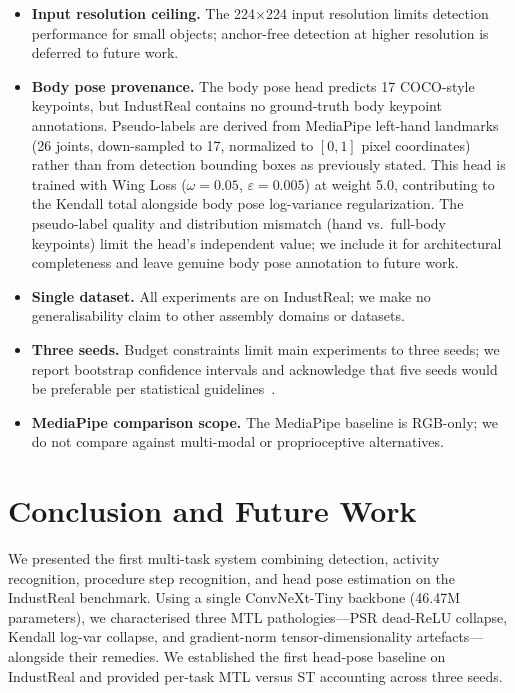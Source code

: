 \documentclass[conference]{IEEEtran}
\begin{document}
\begin{itemize}
    \item \textbf{Input resolution ceiling.} The 224$\times$224 input resolution limits detection performance for small objects; anchor-free detection at higher resolution is deferred to future work.
    \item \textbf{Body pose provenance.} The body pose head predicts 17 COCO-style keypoints, but IndustReal contains no ground-truth body keypoint annotations. Pseudo-labels are derived from MediaPipe left-hand landmarks (26 joints, down-sampled to 17, normalized to $[0,1]$ pixel coordinates) rather than from detection bounding boxes as previously stated. This head is trained with Wing Loss ($\omega=0.05$, $\varepsilon=0.005$) at weight 5.0, contributing to the Kendall total alongside body pose log-variance regularization. The pseudo-label quality and distribution mismatch (hand vs.\ full-body keypoints) limit the head's independent value; we include it for architectural completeness and leave genuine body pose annotation to future work.
    \item \textbf{Single dataset.} All experiments are on IndustReal; we make no generalisability claim to other assembly domains or datasets.
    \item \textbf{Three seeds.} Budget constraints limit main experiments to three seeds; we report bootstrap confidence intervals and acknowledge that five seeds would be preferable per statistical guidelines~\cite{decor2017}.
    \item \textbf{MediaPipe comparison scope.} The MediaPipe baseline is RGB-only; we do not compare against multi-modal or proprioceptive alternatives.
\end{itemize}

\section{Conclusion and Future Work}
\label{sec:conclusion}

We presented the first multi-task system combining detection, activity recognition, procedure step recognition, and head pose estimation on the IndustReal benchmark. Using a single ConvNeXt-Tiny backbone (46.47M parameters), we characterised three MTL pathologies---PSR dead-ReLU collapse, Kendall log-var collapse, and gradient-norm tensor-dimensionality artefacts---alongside their remedies. We established the first head-pose baseline on IndustReal and provided per-task MTL versus ST accounting across three seeds.
\end{document}
